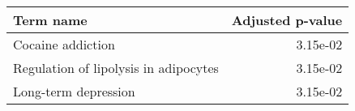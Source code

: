\begin{tabular}{lr}
\toprule
                            Term name &  Adjusted p-value \\
\midrule
                    Cocaine addiction &          3.15e-02 \\
Regulation of lipolysis in adipocytes &          3.15e-02 \\
                 Long-term depression &          3.15e-02 \\
\bottomrule
\end{tabular}
